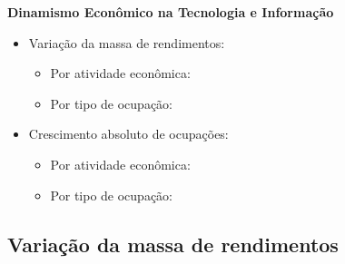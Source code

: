 \documentclass[8pt]{beamer}
\begin{document}
\begin{frame}[label=indice_principal_amz_ti]{}

\textit{\hyperlink{indice_principal}{}}

\textbf{Dinamismo Econômico na Tecnologia e Informação}
\vspace{2mm}

\begin{itemize}

\item{Variação da massa de rendimentos:
	\begin{itemize}
	\item{Por atividade econômica: \hyperlink{amztirkngvmassaporcnae2dig}{}}
	\item{Por tipo de ocupação: \hyperlink{amztirkngvmassaporcod2dig}{}}
	\end{itemize}
}
\vspace{1mm}

\item{Crescimento  absoluto de ocupações:
	\begin{itemize}
	\item{Por atividade econômica: \hyperlink{amztirkngnocuporcnae2dig}{}}
	\item{Por tipo de ocupação: \hyperlink{amztirkngnocuporcod2dig}{}}
	\end{itemize}
}
\vspace{1mm}

\end{itemize}

\end{frame}


\subsection{Variação da massa de rendimentos}

\begin{frame}
\textit{\hyperlink{indice_principal_amz_ti}{}}

\end{frame}

\begin{frame}
\textit{\hyperlink{indice_principal_amz_ti}{}}

\end{frame}
\end{document}
